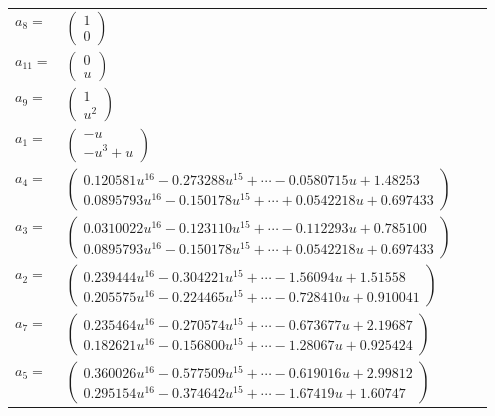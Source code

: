 \documentclass[1p]{elsarticle_modified}
\theoremstyle{definition}
\begin{document}
\begin{tabular}{m{7pt} m{180pt} m{7pt} m{180pt} }
\flushright $a_{8}=$&$\begin{pmatrix}1\\0\end{pmatrix}$ \\
\flushright $a_{11}=$&$\begin{pmatrix}0\\u\end{pmatrix}$ \\
\flushright $a_{9}=$&$\begin{pmatrix}1\\u^2\end{pmatrix}$ \\
\flushright $a_{1}=$&$\begin{pmatrix}- u\\- u^3+u\end{pmatrix}$ \\
\flushright $a_{4}=$&$\begin{pmatrix}0.120581 u^{16}-0.273288 u^{15}+\cdots-0.0580715 u+1.48253\\0.0895793 u^{16}-0.150178 u^{15}+\cdots+0.0542218 u+0.697433\end{pmatrix}$ \\
\flushright $a_{3}=$&$\begin{pmatrix}0.0310022 u^{16}-0.123110 u^{15}+\cdots-0.112293 u+0.785100\\0.0895793 u^{16}-0.150178 u^{15}+\cdots+0.0542218 u+0.697433\end{pmatrix}$ \\
\flushright $a_{2}=$&$\begin{pmatrix}0.239444 u^{16}-0.304221 u^{15}+\cdots-1.56094 u+1.51558\\0.205575 u^{16}-0.224465 u^{15}+\cdots-0.728410 u+0.910041\end{pmatrix}$ \\
\flushright $a_{7}=$&$\begin{pmatrix}0.235464 u^{16}-0.270574 u^{15}+\cdots-0.673677 u+2.19687\\0.182621 u^{16}-0.156800 u^{15}+\cdots-1.28067 u+0.925424\end{pmatrix}$ \\
\flushright $a_{5}=$&$\begin{pmatrix}0.360026 u^{16}-0.577509 u^{15}+\cdots-0.619016 u+2.99812\\0.295154 u^{16}-0.374642 u^{15}+\cdots-1.67419 u+1.60747\end{pmatrix}$ \\

\end{tabular}
\end{document}
